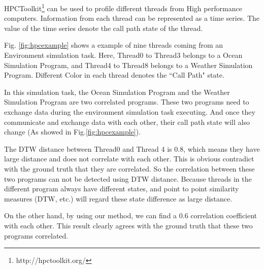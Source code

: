 
HPCToolkit\footnote{http://hpctoolkit.org/} can be used to profile different threads from High performance computers.
Information from each thread can be represented as a time series. The value of the time series denote the call path \cite{adhianto2010hpctoolkit} state of the thread.


Fig. \ref{fig:hpcexample} shows a example of nine threads coming from an Environment simulation task. Here, Thread0 to Thread3 belongs to a Ocean Simulation Program, and Thread4 to Thread8 belongs to a Weather Simulation Program. Different Color in each thread denotes the ``Call Path" state.

In this simulation task, the Ocean Simulation Program and the Weather Simulation Program are two correlated programs.
These two programs need to exchange data during the environment simulation task executing. 
And once they communicate and exchange data with each other, their call path state will also change (As showed in Fig.\ref{fig:hpcexample}).

The DTW distance between Thread0 and Thread 4 is $0.8$, which means they have large distance and does not correlate with each other. This is obvious contradict with the ground truth that they are correlated. So the correlation between these two programs can not be detected using DTW distance. Because threads in the different program always have different states, and point to point similarity measures (DTW, etc.) will regard these state difference as large distance.

On the other hand, by using our method, we can find a $0.6$ correlation coefficient with each other. This result clearly agrees with the ground truth that these two programs correlated.



